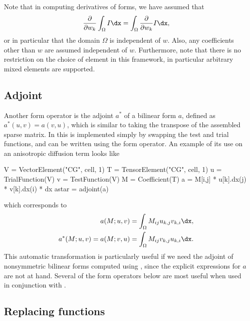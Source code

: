 Note that in computing derivatives of forms, we have assumed that
\begin{align}
\frac{\partial}{\partial w_k} \int_\Omega I \dx
= \int_\Omega \frac{\partial}{\partial w_k} I \dx,
\end{align}
or in particular that the domain $\Omega$ is independent of $w$.
Also, any coefficients other than $w$ are assumed independent of $w$.
Furthermore, note that there is no restriction on the choice of
element in this framework, in particular arbitrary mixed elements are
supported.

\subsection{Adjoint}
\label{ufl:sec:adjoint}

Another form operator is the adjoint $a^*$ of a bilinear form $a$,
defined as $a^*(u,v) = a(v,u)$, which is similar to taking the
transpose of the assembled sparse matrix.  In \ufl{} this is
implemented simply by swapping the test and trial functions,
and can be written using the  form operator.
An example of its use on an anisotropic diffusion term looks like
\begin{python}
V = VectorElement("CG", cell, 1)
T = TensorElement("CG", cell, 1)
u = TrialFunction(V)
v = TestFunction(V)
M = Coefficient(T)
a = M[i,j] * u[k].dx(j) * v[k].dx(i) * dx
astar = adjoint(a)
\end{python}
which corresponds to
\begin{align}
a(M; u, v) = \int_\Omega M_{ij} u_{k,j} v_{k,i} \dx, \\
a^*(M; u, v) = a(M; v, u) = \int_\Omega  M_{ij} v_{k,j} u_{k,i} \dx.
\end{align}
This automatic transformation is particularly useful if we need the
adjoint of nonsymmetric bilinear forms computed using
, since the explicit expressions for $a$ are not at
hand.  Several of the form operators below are most useful when used
in conjunction with .

\subsection{Replacing functions}
\label{ufl:sec:replace}

